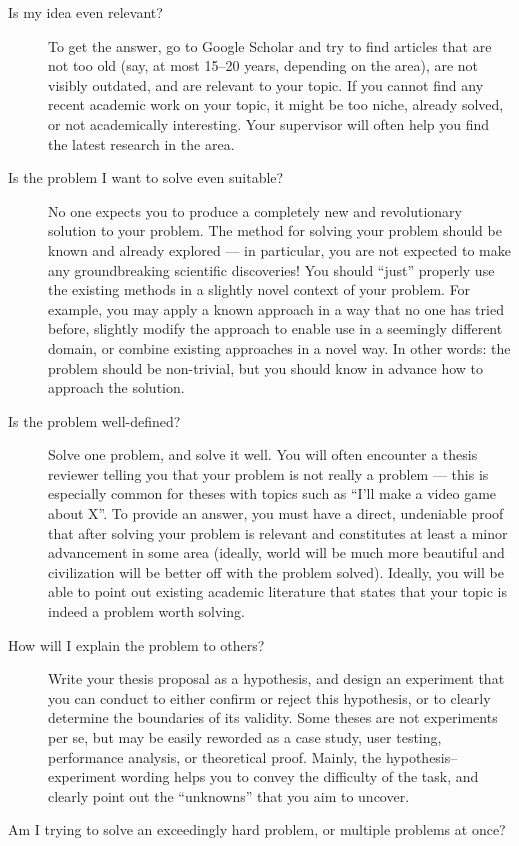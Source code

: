 \begin{description}
\item[Is my idea even relevant?]
To get the answer, go to Google Scholar and try to find articles that are not too old (say, at most 15--20 years, depending on the area), are not visibly outdated, and are relevant to your topic. If you cannot find any recent academic work on your topic, it might be too niche, already solved, or not academically interesting. Your supervisor will often help you find the latest research in the area.
\item[Is the problem I want to solve even suitable?]
No one expects you to produce a completely new and revolutionary solution to your problem. The method for solving your problem should be known and already explored --- in particular, you are not expected to make any groundbreaking scientific discoveries! You should ``just'' properly use the existing methods in a slightly novel context of your problem. For example, you may apply a known approach in a way that no one has tried before, slightly modify the approach to enable use in a seemingly different domain, or combine existing approaches in a novel way. In other words: the problem should be non-trivial, but you should know in advance how to approach the solution.
\item[Is the problem well-defined?]
Solve one problem, and solve it well. You will often encounter a thesis reviewer telling you that your problem is not really a problem --- this is especially common for theses with topics such as ``I'll make a video game about X''. To provide an answer, you must have a direct, undeniable proof that after solving your problem is relevant and constitutes at least a minor advancement in some area (ideally, world will be much more beautiful and civilization will be better off with the problem solved). Ideally, you will be able to point out existing academic literature that states that your topic is indeed a problem worth solving.
\item[How will I explain the problem to others?]
Write your thesis proposal as a hypothesis, and design an experiment that you can conduct to either confirm or reject this hypothesis, or to clearly determine the boundaries of its validity. Some theses are not experiments per se, but may be easily reworded as a case study, user testing, performance analysis, or theoretical proof. Mainly, the hypothesis--experiment wording helps you to convey the difficulty of the task, and clearly point out the ``unknowns'' that you aim to uncover.
\item[Am I trying to solve an exceedingly hard problem, or multiple problems at once?]

\end{description}
